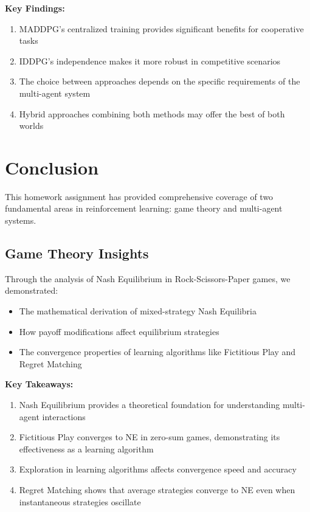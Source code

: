 \documentclass[12pt]{article}
\begin{document}
{{{{{{\textbf{Key Findings:}
\begin{enumerate}
    \item MADDPG's centralized training provides significant benefits for cooperative tasks
    \item IDDPG's independence makes it more robust in competitive scenarios
    \item The choice between approaches depends on the specific requirements of the multi-agent system
    \item Hybrid approaches combining both methods may offer the best of both worlds
\end{enumerate}

\section{Conclusion}

This homework assignment has provided comprehensive coverage of two fundamental areas in reinforcement learning: game theory and multi-agent systems.

\subsection{Game Theory Insights}

Through the analysis of Nash Equilibrium in Rock-Scissors-Paper games, we demonstrated:

\begin{itemize}
    \item The mathematical derivation of mixed-strategy Nash Equilibria
    \item How payoff modifications affect equilibrium strategies
    \item The convergence properties of learning algorithms like Fictitious Play and Regret Matching
\end{itemize}

\textbf{Key Takeaways:}
\begin{enumerate}
    \item Nash Equilibrium provides a theoretical foundation for understanding multi-agent interactions
    \item Fictitious Play converges to NE in zero-sum games, demonstrating its effectiveness as a learning algorithm
    \item Exploration in learning algorithms affects convergence speed and accuracy
    \item Regret Matching shows that average strategies converge to NE even when instantaneous strategies oscillate
\end{enumerate}

}}}}}}
\end{document}
